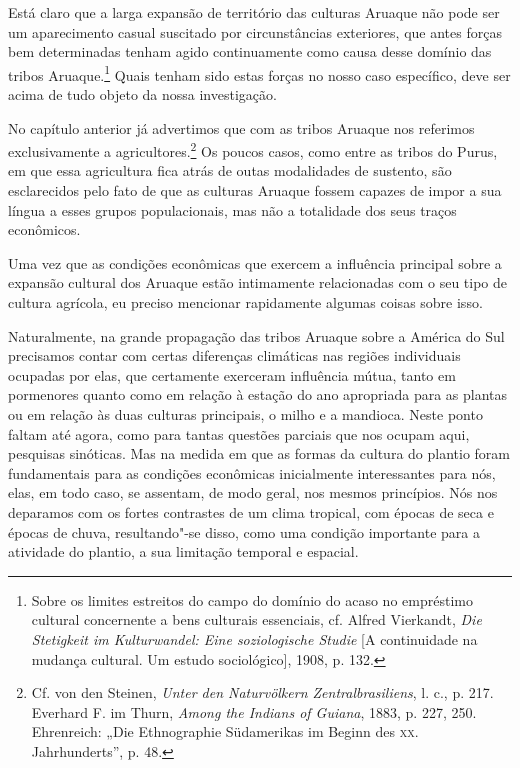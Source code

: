 Está claro que a larga expansão de território das culturas Aruaque não
pode ser um aparecimento casual suscitado por circunstâncias exteriores,
que antes forças bem determinadas tenham agido continuamente como causa
desse domínio das tribos Aruaque.\footnote{Sobre os limites estreitos do
  campo do domínio do acaso no empréstimo cultural concernente a bens
  culturais essenciais, cf. Alfred Vierkandt, \emph{Die Stetigkeit im
  Kulturwandel: Eine soziologische Studie} {[}A continuidade na mudança
  cultural. Um estudo sociológico{]}, 1908, p. 132.} Quais tenham sido
estas forças no nosso caso específico, deve ser acima de tudo objeto da
nossa investigação.

No capítulo anterior já advertimos que com as tribos Aruaque nos
referimos exclusivamente a agricultores.\footnote{Cf. von den Steinen,
  \emph{Unter den Naturvölkern Zentralbrasiliens}, l. c., p. 217.
  Everhard F. im Thurn, \emph{Among the Indians of Guiana}, 1883, p.
  227, 250. Ehrenreich: „Die Ethnographie Südamerikas im Beginn des \textsc{xx}.
  Jahrhunderts'', p. 48.} Os poucos casos, como entre as tribos do
Purus, em que essa agricultura fica atrás de outas modalidades de
sustento, são esclarecidos pelo fato de que as culturas Aruaque fossem
capazes de impor a sua língua a esses grupos populacionais, mas não a
totalidade dos seus traços econômicos.

Uma vez que as condições econômicas que exercem a influência principal
sobre a expansão cultural dos Aruaque estão intimamente relacionadas com
o seu tipo de cultura agrícola, eu preciso mencionar rapidamente algumas
coisas sobre isso.

Naturalmente, na grande propagação das tribos Aruaque sobre a América do
Sul precisamos contar com certas diferenças climáticas nas regiões
individuais ocupadas por elas, que certamente exerceram influência
mútua, tanto em pormenores quanto como em relação à estação do ano
apropriada para as plantas ou em relação às duas culturas principais, o
milho e a mandioca. Neste ponto faltam até agora, como para tantas
questões parciais que nos ocupam aqui, pesquisas sinóticas. Mas na
medida em que as formas da cultura do plantio foram fundamentais para as
condições econômicas inicialmente interessantes para nós, elas, em todo
caso, se assentam, de modo geral, nos mesmos princípios. Nós nos
deparamos com os fortes contrastes de um clima tropical, com épocas de
seca e épocas de chuva, resultando"-se disso, como uma condição
importante para a atividade do plantio, a sua limitação temporal e
espacial.

